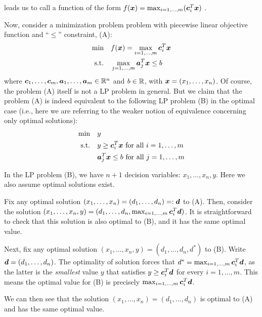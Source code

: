 \begin{enumerate}
 leads us to call a function of the form
\(f(\bm{x})=\max_{i=1,\dotsc,m}(\bm{c}_i^{T}\bm{x})\) .

Now, consider a minimization problem problem with piecewise linear
objective function and ``\(\leq\)'' constraint, (A):
\begin{align*}
\text{min}\quad&f(\bm{x})=\max_{i=1,\dotsc,m}\bm{c}_i^{T}\bm{x} \\
\text{s.t.}\quad&\max_{j=1,\dotsc,m}\bm{a}_j^{T}\bm{x}\le b
\end{align*}
where \(\bm{c}_1,\dotsc,\bm{c}_m,\bm{a}_1,\dotsc,\bm{a}_m\in\mathbb{R}^n\) and
\(b\in\mathbb{R}\), with \(\bm{x}=(x_1,\dotsc,x_n)\). Of course, the problem (A) itself is not a LP problem in general.
But we claim that the problem (A) is indeed equivalent to the following LP
problem (B) in the optimal case (i.e., here we are referring to the weaker
notion of equivalence concerning only optimal solutions):
\begin{align*}
\text{min}\quad&y \\
\text{s.t.}\quad&y\ge \bm{c}_i^{T}\bm{x}\text{ for all \(i=1,\dotsc,m\)} \\
\quad&\bm{a}_j^{T}\bm{x}\le b\text{ for all \(j=1,\dotsc,m\)}
\end{align*}
\begin{note}
In the LP problem (B), we have \(n+1\) decision variables:
\(x_1,\dotsc,x_n,y\). Here we also assume optimal solutions exist.
\end{note}

\begin{pf}
Fix any optimal solution \((x_1,\dotsc,x_n)=(d_1,\dotsc,d_n)=:\bm{d}\) to
(A). Then, consider the solution
\((x_1,\dotsc,x_n,y)=(d_1,\dotsc,d_n,\max_{i=1,\dotsc,m}\bm{c}_i^{T}\bm{d})\).
It is straightforward to check that this solution is also optimal to (B), and
it has the same optimal value.

Next, fix any optimal solution \((x_1,\dotsc,x_n,y)=(d_1,\dotsc,d_n,d^*)\) to
(B).  Write \(\bm{d}=(d_1,\dotsc,d_n)\). The optimality of solution forces
that \(d^*=\max_{i=1,\dotsc,m}\bm{c}_i^{T}\bm{d}\), as the latter is the
\emph{smallest} value \(y\) that satisfies \(y\ge\bm{c}_i^{T}\bm{d}\) for
every \(i=1,\dotsc,m\). This means the optimal value for (B) is precisely
\(\max_{i=1,\dotsc,m}\bm{c}_i^{T}\bm{d}\).


We can then see that the solution \((x_1,\dotsc,x_n)=(d_1,\dotsc,d_n)\) is
optimal to (A) and has the same optimal value.
\end{pf}
\end{enumerate}
